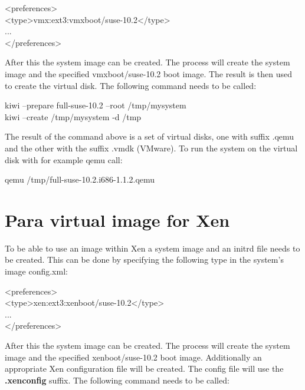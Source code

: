 \begin{Command}{14cm}
<preferences>\\
\hspace*{1cm}<type>vmx:ext3:vmxboot/suse-10.2</type>\\
\hspace*{1cm}...\\
</preferences>
\end{Command}

After this the system image can be created. The process will create the
system image and the specified vmxboot/suse-10.2 boot image. The result
is then used to create the virtual disk. The following command needs
to be called:

\begin{Command}{14cm}
	kiwi --prepare full-suse-10.2 --root /tmp/mysystem\\
	kiwi --create /tmp/mysystem -d /tmp
\end{Command}

The result of the command above is a set of virtual disks, one with
suffix .qemu and the other with the suffix .vmdk (VMware). To run the
system on the virtual disk with for example qemu call:

\begin{Command}{14cm}
	qemu /tmp/full-suse-10.2.i686-1.1.2.qemu
\end{Command}

\section{Para virtual image for Xen}
To be able to use an image within Xen a system image and an initrd file
needs to be created. This can be done by specifying the following type in the
system's image config.xml:

\begin{Command}{14cm}
<preferences>\\
\hspace*{1cm}<type>xen:ext3:xenboot/suse-10.2</type>\\
\hspace*{1cm}...\\
</preferences>
\end{Command}

After this the system image can be created. The process will create the
system image and the specified xenboot/suse-10.2 boot image. Additionally
an appropriate Xen configuration file will be created. The config file
will use the \textbf{.xenconfig} suffix. The following command needs
to be called:

